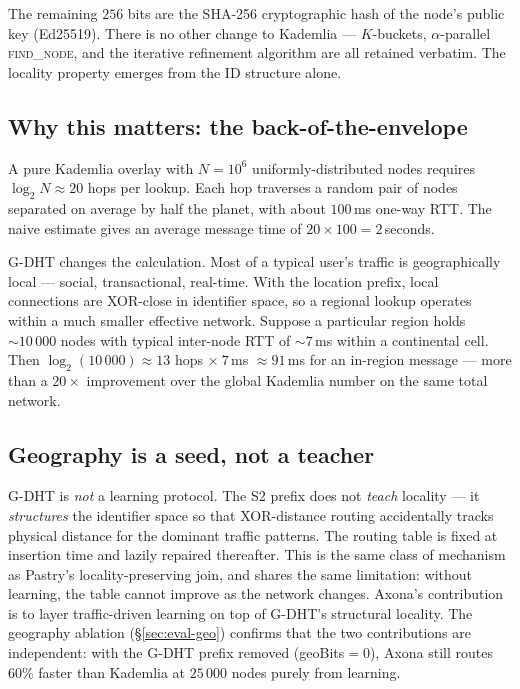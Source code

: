 \documentclass[conference]{IEEEtran}
\newcommand{\axona}{Axona\xspace}
\newcommand{\GDHT}{G-DHT\xspace}
\begin{document}
The remaining $256$ bits are the SHA-256 cryptographic hash of
the node's public key (Ed25519).  There is no other change to Kademlia ---
$K$-buckets, $\alpha$-parallel \textsc{find\_node}, and the
iterative refinement algorithm are all retained verbatim.  The
locality property emerges from the ID structure alone.

\subsection{Why this matters: the back-of-the-envelope}
A pure Kademlia overlay with $N = 10^6$ uniformly-distributed
nodes requires $\log_2 N \approx 20$ hops per lookup.  Each hop
traverses a random pair of nodes separated on average by half
the planet, with about $100$\,ms one-way RTT.  The naive
estimate gives an average message time of $20 \times 100 =
2$\,seconds.

\GDHT changes the calculation.  Most of a typical user's
traffic is geographically local --- social, transactional,
real-time.  With the location prefix, local connections are
XOR-close in identifier space, so a regional lookup operates
within a much smaller effective network.  Suppose a particular
region holds $\sim\!10\,000$ nodes with typical inter-node RTT
of $\sim\!7$\,ms within a continental cell.  Then
$\log_2(10\,000) \approx 13$ hops $\times\ 7$\,ms $\approx
91$\,ms for an in-region message --- more than a $20\times$
improvement over the global Kademlia number on the same total
network.

\subsection{Geography is a seed, not a teacher}
\GDHT is \emph{not} a learning protocol.  The S2 prefix does
not \emph{teach} locality --- it \emph{structures} the
identifier space so that XOR-distance routing accidentally
tracks physical distance for the dominant traffic patterns.
The routing table is fixed at insertion time and lazily
repaired thereafter.  This is the same class of mechanism as
Pastry's locality-preserving join, and shares the same
limitation: without learning, the table cannot improve as the
network changes.  \axona's contribution is to layer
traffic-driven learning on top of \GDHT's structural locality.
The geography ablation (\S\ref{sec:eval-geo}) confirms that the
two contributions are independent: with the \GDHT prefix
removed (geoBits$=0$), \axona still routes $60\%$ faster than
Kademlia at $25\,000$ nodes purely from learning.
\end{document}
